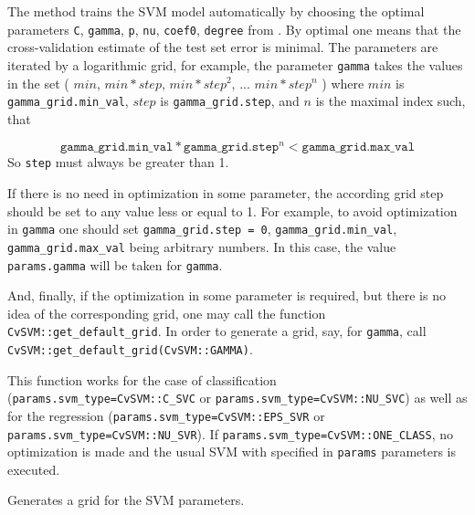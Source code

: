 The method trains the SVM model automatically by choosing the optimal
parameters \texttt{C}, \texttt{gamma}, \texttt{p}, \texttt{nu},
\texttt{coef0}, \texttt{degree} from . By optimal
one means that the cross-validation estimate of the test set error
is minimal. The parameters are iterated by a logarithmic grid, for
example, the parameter \texttt{gamma} takes the values in the set
( $min$, $min*step$, $min*{step}^2$, ... $min*{step}^n$ )
where $min$ is \texttt{gamma\_grid.min\_val}, $step$ is
\texttt{gamma\_grid.step}, and $n$ is the maximal index such, that

\[ \texttt{gamma\_grid.min\_val}*\texttt{gamma\_grid.step}^n < \texttt{gamma\_grid.max\_val} \]
So \texttt{step} must always be greater than 1.

If there is no need in optimization in some parameter, the according grid step should be set to any value less or equal to 1. For example, to avoid optimization in \texttt{gamma} one should set \texttt{gamma\_grid.step = 0}, \texttt{gamma\_grid.min\_val}, \texttt{gamma\_grid.max\_val} being arbitrary numbers. In this case, the value \texttt{params.gamma} will be taken for \texttt{gamma}.

And, finally, if the optimization in some parameter is required, but
there is no idea of the corresponding grid, one may call the function
\texttt{CvSVM::get\_default\_grid}. In
order to generate a grid, say, for \texttt{gamma}, call
\texttt{CvSVM::get\_default\_grid(CvSVM::GAMMA)}.

This function works for the case of classification 
(\texttt{params.svm\_type=CvSVM::C\_SVC} or \texttt{params.svm\_type=CvSVM::NU\_SVC}) 
as well as for the regression 
(\texttt{params.svm\_type=CvSVM::EPS\_SVR} or \texttt{params.svm\_type=CvSVM::NU\_SVR}). If 
\texttt{params.svm\_type=CvSVM::ONE\_CLASS}, no optimization is made and the usual SVM with specified in \texttt{params} parameters is executed.

Generates a grid for the SVM parameters.


\begin{description}
\end{description}

